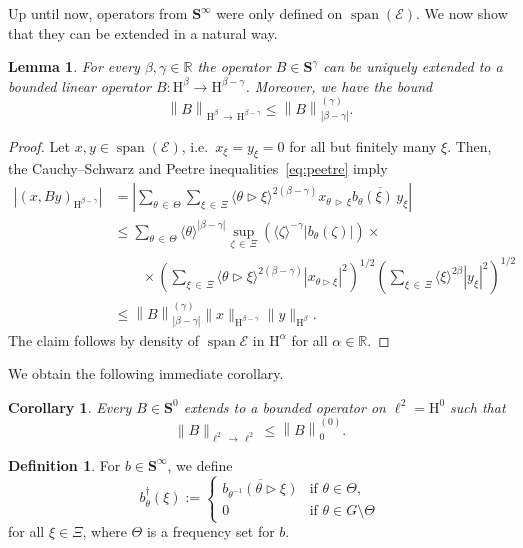 \documentclass[10pt]{amsart}
\newtheorem{lemm}[theo]{Lemma}\newtheorem{prop}[theo]{Proposition}\newtheorem{coro}[theo]{Corollary}\newtheorem{conj}[theo]{Conjecture}
\theoremstyle{definition}\newtheorem{defi}[theo]{Definition}\newtheorem{rema}[theo]{Remark}\newtheorem{exam}[theo]{Example}\newtheorem{nota}[theo]{Notation}
\DeclareMathOperator{\spann}{span}
\renewcommand{\mathsf}{\mathrm}
\newcommand{\sfH}{\mathsf{H}}
\newcommand{\R}{\mathbb R}
\newcommand{\CE}{\mathcal{E}}
\newcommand{\BS}{\mathbf S}
\newcommand{\act}{\triangleright}
\newcommand{\abs}[1]{\left\lvert #1 \right\rvert}
\newcommand{\norm}[1]{\left\| #1 \right\|}
\newcommand{\snorm}[3]{\left\| #1\right\|_{#3}^{(#2)}}
\newcommand{\ang}[1]{\langle #1 \rangle}
\begin{document}
Up until now, operators from $\BS^\infty$ were only defined on $\spann(\CE)$. We now show that they can be extended in a natural way.
\begin{lemm} \label{lem:domain}
For every $\beta,\gamma\in\R$ the operator $B \in \BS^\gamma$ can be uniquely extended to a bounded linear operator $B : \sfH^{\beta} \to \sfH^{\beta-\gamma}$. Moreover, we have the bound
\begin{equation}
\norm{B}_{\sfH^{\beta}\,\to\,\sfH^{\beta-\gamma}}
\le \snorm{B}{\gamma}{\abs{\beta-\gamma}}.
\end{equation}
\end{lemm}
\begin{proof}
Let $x,y \in \spann(\CE)$, i.e.~$x_\xi=y_\xi=0$ for all but finitely many $\xi$. Then, the Cauchy--Schwarz and Peetre inequalities~\eqref{eq:peetre} imply
\begin{equation}
\begin{aligned}
\left|(x,By)_{\sfH^{\beta-\gamma}} \right|& = \abs{\sum_{\theta\,\in\,\Theta} \sum_{\xi\,\in\,\Xi}
\ang{\theta\act\xi}^{2(\beta - \gamma)} x_{\theta\,\act\,\xi} \overline{ b_\theta(\xi)\,y_\xi}}
\\
&\le \sum_{\theta\,\in\,\Theta} \ang \theta^{\abs{\beta-\gamma}}
\sup_{\zeta\,\in\,\Xi} \left(\ang{\zeta}^{-\gamma}\abs{b_\theta(\zeta)}\right) \times \\
& \qquad \times \left(\sum_{\xi\,\in\,\Xi}\ang{\theta \act \xi}^{2(\beta-\gamma)}
\abs{x_{\theta\act\xi}}^2\right)^{1/2}
\left(\sum_{\xi\,\in\,\Xi} \ang \xi^{2\beta} \abs{ y_\xi}^2\right)^{1/2}\\
&\leq \snorm{B}{\gamma}{\abs{\beta-\gamma}} \|x\|_{\sfH^{\beta-\gamma} } \|y\|_{\sfH^{\beta}}.
\end{aligned}
\end{equation}
The claim follows by density of $\spann\CE$ in $\sfH^{\alpha}$ for all $\alpha\in\R$.
\end{proof}

We obtain the following immediate corollary.

\begin{coro} \label{cor:domain}
Every $B \in \BS^0$ extends to a bounded operator on $\ell^2 =\sfH^0$ such that
\begin{equation}
\|B\|_{\ell^2\,\to\,\ell^2} \le \snorm{B}{0}{0}.
\end{equation}
\end{coro}

\begin{defi}
For $b\in\BS^\infty$, we define
\begin{equation}\label{eq:adjoint symbol}
b^\dagger_\theta(\xi):=
\begin{cases}\overline{b_{\theta^{-1}}(\theta\act\xi)}&
\text{if } \theta\in \Theta,\\
0& \text{if }\theta\in G\setminus\Theta
\end{cases}
\end{equation}
for all $\xi\in\Xi$, where $\Theta$ is a frequency set for $b$.
\end{defi}
\end{document}

